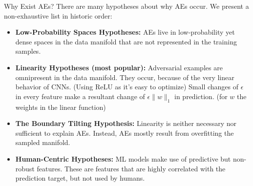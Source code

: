 \documentclass[11pt,compress,t,notes=noshow, xcolor=table]{beamer}
\begin{document}
\begin{vbframe}{Why Exist AEs?}
There are many hypotheses about why AEs occur. We present a non-exhaustive list in historic order:
\begin{itemize}
    \item \textbf{Low-Probability Spaces Hypotheses:} AEs live in low-probability yet dense spaces in the data manifold that are not represented in the training samples.
    \item \textbf{Linearity Hypotheses (most popular):} Adversarial examples are omnipresent in the data manifold. They occur, because of the very linear behavior of CNNs. (Using ReLU as it's easy to optimize) Small changes of $\epsilon$ in every feature make a resultant change of $\epsilon\|w\|_1$ in prediction. (for $w$ the weights in the linear function)
    \item \textbf{The Boundary Tilting Hypothesis:} Linearity is neither necessary nor sufficient to explain AEs. Instead, AEs mostly result from overfitting the sampled manifold.
    \item \textbf{Human-Centric Hypotheses:} ML models make use of predictive but non-robust features. These are features that are highly correlated with the prediction target, but not used by humans.
\end{itemize}
\end{vbframe}
\end{document}
